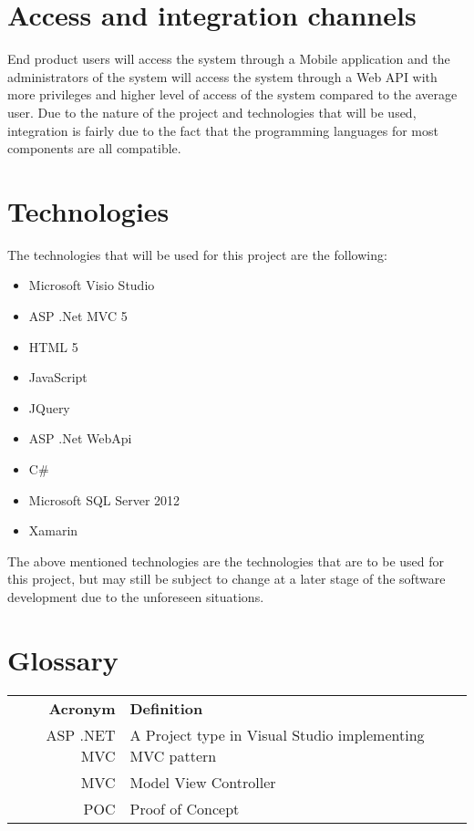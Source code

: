 \documentclass[11pt,titlepage]{article} %
\begin{document}
\section{Access and integration channels}
End product users will access the system through a Mobile application and the administrators of the system will access the system through a Web API with more privileges and higher level of access of the system compared to the average user. Due to the nature of the project and technologies that will be used, integration is fairly due to the fact that the programming languages for most components are all compatible.

\section{Technologies}
The technologies that will be used  for this project are the following:
\begin{itemize}
	\item{Microsoft Visio Studio}
	\item{ASP .Net MVC 5}
	\item{HTML 5}
	\item{JavaScript}
	\item{JQuery}
	\item{ASP .Net WebApi}
	\item{C\#}
	\item{Microsoft SQL Server 2012}
	\item{Xamarin}
	\end{itemize}
The above mentioned technologies are the technologies that are to be used for this project, but may still be subject to change at a later stage of the software development due to the unforeseen situations. 
	

\newpage
\appendix
\section{Glossary} \label{App:AppendixA}
\begin{tabular}{rl}
	\textbf{Acronym} & \textbf{Definition} \\[0.5cm]
	ASP .NET MVC & A Project type in Visual Studio implementing MVC pattern \\
	MVC & Model View Controller \\
	POC & Proof of Concept
\end{tabular}
\end{document}
